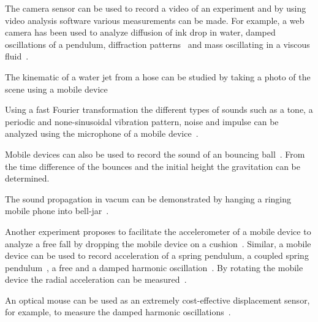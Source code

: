 \documentclass{sigchi}
\begin{document}
\cite{Kearney2012}
\cite{Etkina2006}
\cite{Millar2002}
\cite{Trumper2003}



The camera sensor can be used to record a video of an experiment and by using video analysis software various measurements can be made.
For example, a web camera has been used to analyze diffusion of ink drop in water, damped oscillations of a pendulum, diffraction patterns~\cite{Nedev2006} and mass oscillating in a viscous fluid~\cite{Shamim2010}.

The kinematic of a water jet from a hose can be studied by taking a photo of the scene using a mobile device~\cite{Falcao2009}


Using a fast Fourier transformation the different types of sounds such as a tone, a periodic and none-sinusoidal vibration pattern, noise and impulse can be analyzed using the microphone of a mobile device~\cite{KuhnAcousticPhenomena2013}.

Mobile devices can also be used to record the sound of an bouncing ball~\cite{Schwarz2013Acoustic}.
From the time difference of the bounces and the initial height the gravitation can be determined.

The sound propagation in vacum can be demonstrated by hanging a ringing mobile phone into bell-jar~\cite{CaleonBellJar2013}.



Another experiment proposes to facilitate the accelerometer of a mobile device to analyze a free fall by dropping the mobile device on a cushion~\cite{VogtFreeFall2012}.
Similar, a mobile device can be used to record acceleration of a spring pendulum, a coupled spring pendulum~\cite{KuhnPendulum2012}, a free and a damped harmonic oscillation~\cite{Castro2013}.
By rotating the mobile device the radial acceleration can be measured~\cite{VogtRadialAcc2013}.



An optical mouse can be used as an extremely cost-effective displacement sensor, for example, to measure the damped harmonic oscillations~\cite{Ng2005}.
\end{document}
